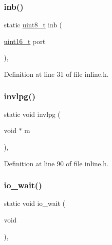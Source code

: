 \mbox{\label{a00035_a0223c8898dfec29069879dc51076e28a_a0223c8898dfec29069879dc51076e28a}} 
\subsubsection{\texorpdfstring{inb()}{inb()}}
{\footnotesize\ttfamily static \hyperlink{a00032_aba7bc1797add20fe3efdf37ced1182c5_aba7bc1797add20fe3efdf37ced1182c5}{uint8\+\_\+t} inb (\begin{DoxyParamCaption}\item[{\hyperlink{a00032_a273cf69d639a59973b6019625df33e30_a273cf69d639a59973b6019625df33e30}{uint16\+\_\+t}}]{port }\end{DoxyParamCaption})\hspace{0.3cm}{\ttfamily [inline]}, {\ttfamily [static]}}



Definition at line 31 of file inline.\+h.

\mbox{\label{a00035_a20faed26baa341152aa32288418f1457_a20faed26baa341152aa32288418f1457}} 
\subsubsection{\texorpdfstring{invlpg()}{invlpg()}}
{\footnotesize\ttfamily static void invlpg (\begin{DoxyParamCaption}\item[{void $\ast$}]{m }\end{DoxyParamCaption})\hspace{0.3cm}{\ttfamily [inline]}, {\ttfamily [static]}}



Definition at line 90 of file inline.\+h.

\mbox{\label{a00035_a488d1b3600792ee3aac5be4b7e0be16b_a488d1b3600792ee3aac5be4b7e0be16b}} 
\subsubsection{\texorpdfstring{io\+\_\+wait()}{io\_wait()}}
{\footnotesize\ttfamily static void io\+\_\+wait (\begin{DoxyParamCaption}\item[{void}]{ }\end{DoxyParamCaption})\hspace{0.3cm}{\ttfamily [inline]}, {\ttfamily [static]}}



